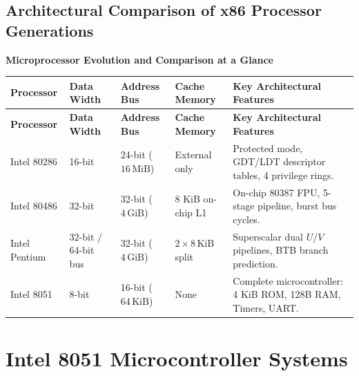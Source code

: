 \documentclass[12pt,a4paper]{article}
\begin{document}
\subsection{Architectural Comparison of x86 Processor Generations}
\begingroup
\par\smallskip\noindent \textbf{Microprocessor Evolution and Comparison at a Glance}\par\nobreak
\par\vspace{5pt}
\begingroup
\setlength{\extrarowheight}{2.5pt}
\begingroup
\setlength{\LTleft}{0pt}
\setlength{\LTright}{0pt}
\begin{longtable}{|B{2.8cm}|B{2.2cm}|B{2.2cm}|B{2.4cm}|>{\small\raggedright\arraybackslash}m{\dimexpr(\linewidth-2.8cm-2.2cm-2.2cm-2.4cm-10\arrayrulewidth)/1\relax}|}
\hline
\textbf{Processor} & \textbf{Data Width} & \textbf{Address Bus} & \textbf{Cache Memory} & \textbf{Key Architectural Features} \\ \hline
\endfirsthead
\hline
\textbf{Processor} & \textbf{Data Width} & \textbf{Address Bus} & \textbf{Cache Memory} & \textbf{Key Architectural Features} \\ \hline
\endhead
Intel 80286 & 16-bit & 24-bit ($16\,\mathrm{MiB}$) & External only & Protected mode, GDT/LDT descriptor tables, 4 privilege rings. \\ \hline
Intel 80486 & 32-bit & 32-bit ($4\,\mathrm{GiB}$) & 8 KiB on-chip L1 & On-chip 80387 FPU, 5-stage pipeline, burst bus cycles. \\ \hline
Intel Pentium & 32-bit / 64-bit bus & 32-bit ($4\,\mathrm{GiB}$) & $2 \times 8\,\mathrm{KiB}$ split & Superscalar dual $U/V$ pipelines, BTB branch prediction. \\ \hline
Intel 8051 & 8-bit & 16-bit ($64\,\mathrm{KiB}$) & None & Complete microcontroller: 4 KiB ROM, 128B RAM, Timers, UART. \\ \hline
\end{longtable}
\endgroup\par
\endgroup
\endgroup

\section{Intel 8051 Microcontroller Systems}
\end{document}
